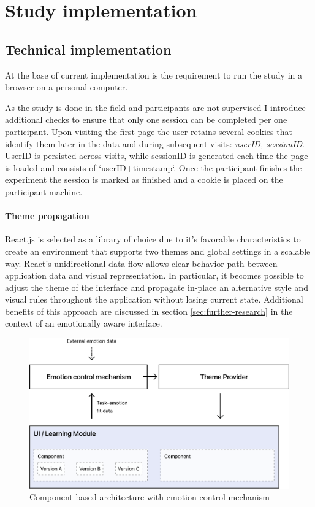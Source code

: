 \section{Study implementation}



\subsection{Technical implementation} \label{sec:study_technical_implementation}
At the base of current implementation is the requirement to run the study in a browser on a personal computer. 

As the study is done in the field and participants are not supervised I introduce additional checks to ensure that only one session can be completed per one participant. Upon visiting the first page the user retains several cookies that identify them later in the data and during subsequent visits: \textit{userID, sessionID}. UserID is persisted across visits, while sessionID is generated each time the page is loaded and consists of `userID+timestamp`. Once the participant finishes the experiment the session is marked as finished and a cookie is placed on the participant machine.

\paragraph{Theme propagation} React.js is selected as a library of choice due to it's favorable characteristics to create an environment that supports two themes and global settings in a scalable way. React's unidirectional data flow allows clear behavior path between application data and visual representation. In particular, it becomes possible to adjust the theme of the interface and propagate in-place an alternative style and visual rules throughout the application without losing current state. Additional benefits of this approach are discussed in section \ref{sec:further-research} in the context of an emotionally aware interface.

\begin{figure}
	\centering
	\includegraphics[width=1\linewidth]{graphics/App-Architecture}
	\caption{Component based architecture with emotion control mechanism}
	\label{fig:app-architecture}
\end{figure}

